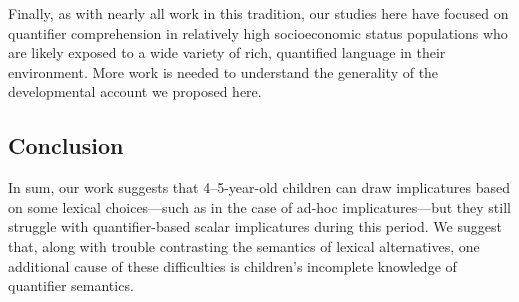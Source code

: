 \documentclass[man]{apa2}
\begin{document}
Finally, as with nearly all work in this tradition, our studies here have focused on quantifier comprehension in relatively high socioeconomic status populations who are likely exposed to a wide variety of rich, quantified language in their environment. More work is needed to understand the generality of the developmental account we proposed here.

\subsection{Conclusion}

In sum, our work suggests that 4--5-year-old children can draw implicatures based on some lexical choices---such as in the case of ad-hoc implicatures---but they still struggle with quantifier-based scalar implicatures during this period. We suggest that, along with trouble contrasting the semantics of lexical alternatives, one additional cause of these difficulties is children's incomplete knowledge of quantifier semantics.


\end{document}

